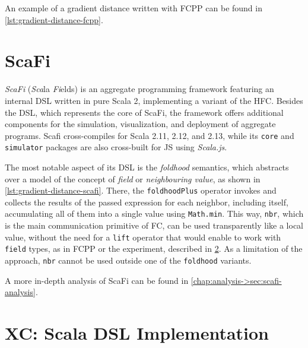 An example of a gradient distance written with FCPP can be found in \cref{lst:gradient-distance-fcpp}.




\section{ScaFi} \label{chap:state-of-the-art->sec:scafi}

\textit{ScaFi} (\textit{Sca}la \textit{Fi}elds) is an aggregate programming framework featuring an internal \ac{DSL} written in pure Scala 2\cite{scafi}, implementing a variant of the \ac{HFC}.
%
Besides the \ac{DSL}, which represents the core of ScaFi, the framework offers additional components for the simulation, visualization, and deployment of aggregate programs.
%
Scafi cross-compiles for Scala 2.11, 2.12, and 2.13, while its \texttt{core} and \texttt{simulator} packages are also cross-built for \ac{JS} using \textit{Scala.js}\cite{scala-js}.

The most notable aspect of its \ac{DSL} is the \textit{foldhood} semantics, which abstracts over a model of the concept of \textit{field} or \textit{neighbouring value}, as shown in \cref{lst:gradient-distance-scafi}.
%
There, the \texttt{foldhoodPlus} operator invokes and collects the results of the passed expression for each neighbor, including itself, accumulating all of them into a single value using \texttt{Math.min}.
%
This way, \texttt{nbr}, which is the main communication primitive of \ac{FC}, can be used transparently like a local value, without the need for a \texttt{lift} operator that would enable to work with \texttt{field} types, as in FCPP or the  experiment, described in \cref{chap:state-of-the-art->sec:xc-experiment}.
%
As a limitation of the approach, \texttt{nbr} cannot be used outside one of the \texttt{foldhood} variants.



A more in-depth analysis of ScaFi can be found in \cref{chap:analysis->sec:scafi-analysis}.

\section{XC: Scala DSL Implementation} \label{chap:state-of-the-art->sec:xc-experiment}


